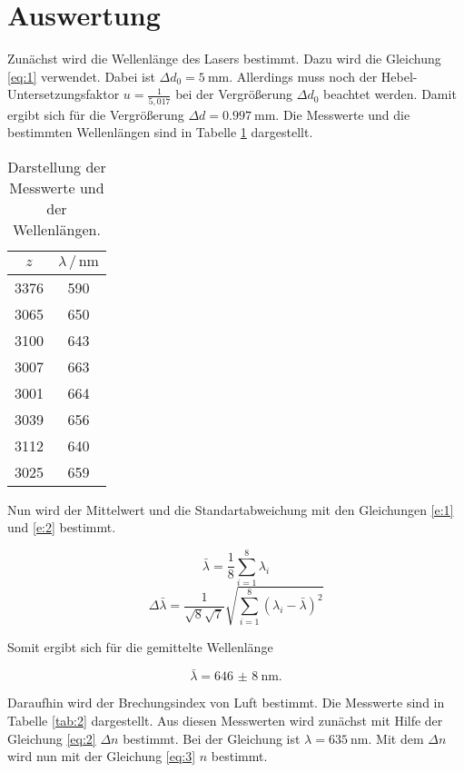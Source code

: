 \section{Auswertung}

Zunächst wird die Wellenlänge des Lasers bestimmt. Dazu wird die Gleichung
\ref{eq:1} verwendet. Dabei ist $\Delta d_0 = \SI{5}{\milli\meter}$. Allerdings muss
noch der Hebel-Untersetzungsfaktor $u = \frac{1}{5,017}$ bei der Vergrößerung $\Delta d_0$
beachtet werden. Damit ergibt sich für die Vergrößerung $\Delta d = \SI{0.997}{\milli\meter}$.
Die Messwerte und die bestimmten Wellenlängen sind in Tabelle \ref{tab:1} dargestellt.

\begin{table}[H]
  \centering
  \caption{Darstellung der Messwerte und der Wellenlängen.}
  \label{tab:1}
  \begin{tabular}{c c}
    \toprule
    $z$ & $\lambda \, / \, \si{\nano\meter}$ \\
    \midrule
    3376 & 590 \\
    3065 & 650 \\
    3100 & 643 \\
    3007 & 663 \\
    3001 & 664 \\
    3039 & 656 \\
    3112 & 640 \\
    3025 & 659 \\
    \bottomrule
  \end{tabular}
\end{table}

Nun wird der Mittelwert und die Standartabweichung mit den Gleichungen \ref{e:1} und
\ref{e:2} bestimmt.


\begin{equation}
    \bar{\lambda} = \frac{1}{8} \sum_{i=1}^{8} \lambda_i
    \label{e:1}
\end{equation}
\begin{equation}
  \Delta \bar{\lambda} = \frac{1}{\sqrt{8}\sqrt{7}} \sqrt{\sum_{i=1}^{8}(\lambda_i-\bar{\lambda})^2}
  \label{e:2}
\end{equation}

Somit ergibt sich für die gemittelte Wellenlänge

\begin{equation*}
  \bar{\lambda} = \SI{646(8)}{\nano\meter}.
\end{equation*}

Daraufhin wird der Brechungsindex von Luft bestimmt. Die Messwerte sind in Tabelle
\ref{tab:2} dargestellt. Aus diesen Messwerten wird zunächst mit Hilfe der Gleichung
\ref{eq:2} $\Delta n$ bestimmt. Bei der Gleichung ist $\lambda = \SI{635}{\nano\meter}$.
Mit dem $\Delta n$ wird nun mit der Gleichung \ref{eq:3} $n$ bestimmt.

